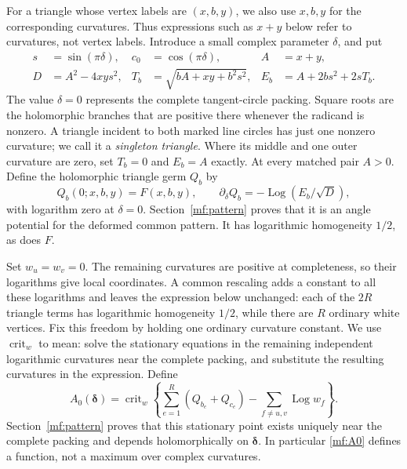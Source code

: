 \documentclass[11pt]{article}
\numberwithin{equation}{section}
\theoremstyle{definition}
\theoremstyle{remark}
\newcommand{\Log}{\operatorname{Log}}
\begin{document}
For a triangle whose vertex labels are \((x,b,y)\), we also use
\(x,b,y\) for the corresponding curvatures. Thus expressions such
as \(x+y\) below refer to curvatures, not vertex labels. Introduce
a small complex parameter
\(\delta\), and put
\begin{equation}\label{mf:local-data}
\begin{aligned}
 s&=\sin(\pi\delta),& c_0&=\cos(\pi\delta),& A&=x+y,\\
 D&=A^2-4xy s^2,&
 T_b&=\sqrt{bA+xy+b^2s^2},&
 E_b&=A+2bs^2+2sT_b.
\end{aligned}
\end{equation}
The value \(\delta=0\) represents the complete tangent-circle
packing. Square roots are the holomorphic branches that are positive
there whenever the radicand is nonzero. A triangle incident to both
marked line circles has just one nonzero curvature; we call it a
\emph{singleton triangle}. Where its middle and one outer curvature
are zero,
set \(T_b=0\) and \(E_b=A\) exactly. At every matched pair \(A>0\).
Define the holomorphic triangle germ \(Q_b\) by
\begin{equation}\label{mf:Q}
 Q_b(0;x,b,y)=F(x,b,y),\qquad
 \partial_\delta Q_b=-\Log(E_b/\sqrt D),
\end{equation}
with logarithm zero at \(\delta=0\). Section~\ref{mf:pattern} proves
that it is an angle potential for the deformed common pattern.
It has logarithmic homogeneity \(1/2\), as does \(F\).

Set \(w_u=w_v=0\). The remaining curvatures are positive at
completeness, so their logarithms give local coordinates. A common
rescaling adds a constant to all these logarithms and leaves the
expression below unchanged: each of the \(2R\) triangle terms has
logarithmic homogeneity \(1/2\), while there are \(R\) ordinary
white vertices. Fix this freedom by holding one ordinary curvature
constant. We use \(\operatorname{crit}_w\) to mean: solve the
stationary equations in the remaining independent logarithmic
curvatures near the complete packing, and substitute the resulting
curvatures in the expression. Define
\begin{equation}\label{mf:A0}
 A_0(\boldsymbol\delta)
   =\operatorname{crit}_{w}
       \left\{\sum_{e=1}^R(Q_{b_e}+Q_{c_e})
                       -\sum_{f\ne u,v}\Log w_f\right\}.
\end{equation}
Section~\ref{mf:pattern} proves that this stationary point exists
uniquely near the complete packing and depends holomorphically on
\(\boldsymbol\delta\). In particular \eqref{mf:A0} defines a
function, not a maximum over complex curvatures.
\end{document}
